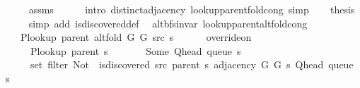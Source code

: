 \begin{isabellebody}
\ \ \ \ \isamarkupfalse%
\ assms\isanewline
\ \ \ \ \isamarkupfalse%
\ {\isacharparenleft}{\kern0pt}intro\ distinct{\isacharunderscore}{\kern0pt}adjacency\ lookup{\isacharunderscore}{\kern0pt}parent{\isacharunderscore}{\kern0pt}fold{\isacharunderscore}{\kern0pt}cong{\isacharparenright}{\kern0pt}\ simp\isanewline
\ \ \isamarkupfalse%
\ {\isacharquery}{\kern0pt}thesis\isanewline
\ \ \ \ \isamarkupfalse%
\ {\isacharparenleft}{\kern0pt}simp\ add{\isacharcolon}{\kern0pt}\ is{\isacharunderscore}{\kern0pt}discovered{\isacharunderscore}{\kern0pt}def{\isacharparenright}{\kern0pt}\isanewline
{}\isamarkupfalse%
%
\endisatagproof
{\isafoldproof}%
%
\isadelimproof
\isanewline
%
\endisadelimproof
\isanewline
{}\isamarkupfalse%
\ {\isacharparenleft}{\kern0pt}\ alt{\isacharunderscore}{\kern0pt}bfs{\isacharunderscore}{\kern0pt}invar{\isacharparenright}{\kern0pt}\ lookup{\isacharunderscore}{\kern0pt}parent{\isacharunderscore}{\kern0pt}alt{\isacharunderscore}{\kern0pt}fold{\isacharunderscore}{\kern0pt}cong{\isacharcolon}{\kern0pt}\isanewline
\ \ \isanewline
\ \ \ \ {\isachardoublequoteopen}P{\isacharunderscore}{\kern0pt}lookup\ {\isacharparenleft}{\kern0pt}parent\ {\isacharparenleft}{\kern0pt}alt{\isacharunderscore}{\kern0pt}fold\ G{}\ G{}\ src\ s{\isacharparenright}{\kern0pt}{\isacharparenright}{\kern0pt}\ {\isacharequal}{\kern0pt}\isanewline
\ \ \ \ \ override{\isacharunderscore}{\kern0pt}on\isanewline
\ \ \ \ \ \ {\isacharparenleft}{\kern0pt}P{\isacharunderscore}{\kern0pt}lookup\ {\isacharparenleft}{\kern0pt}parent\ s{\isacharparenright}{\kern0pt}{\isacharparenright}{\kern0pt}\isanewline
\ \ \ \ \ \ {\isacharparenleft}{\kern0pt}{\isasymlambda}{\isacharunderscore}{\kern0pt}{\isachardot}{\kern0pt}\ Some\ {\isacharparenleft}{\kern0pt}Q{\isacharunderscore}{\kern0pt}head\ {\isacharparenleft}{\kern0pt}queue\ s{\isacharparenright}{\kern0pt}{\isacharparenright}{\kern0pt}{\isacharparenright}{\kern0pt}\isanewline
\ \ \ \ \ \ {\isacharparenleft}{\kern0pt}set\ {\isacharparenleft}{\kern0pt}filter\ {\isacharparenleft}{\kern0pt}Not\ {\isasymcirc}\ is{\isacharunderscore}{\kern0pt}discovered\ src\ {\isacharparenleft}{\kern0pt}parent\ s{\isacharparenright}{\kern0pt}{\isacharparenright}{\kern0pt}\ {\isacharparenleft}{\kern0pt}adjacency\ G{}\ G{}\ s\ {\isacharparenleft}{\kern0pt}Q{\isacharunderscore}{\kern0pt}head\ {\isacharparenleft}{\kern0pt}queue\ s{\isacharparenright}{\kern0pt}{\isacharparenright}{\kern0pt}{\isacharparenright}{\kern0pt}{\isacharparenright}{\kern0pt}{\isacharparenright}{\kern0pt}{\isachardoublequoteclose}\isanewline

\end{isabellebody}
